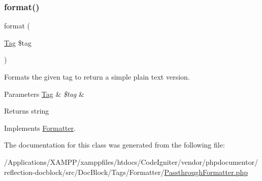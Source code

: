 \subsubsection{\texorpdfstring{format()}{format()}}
{\footnotesize\ttfamily format (\begin{DoxyParamCaption}\item[{\mbox{\hyperlink{interfacephp_documentor_1_1_reflection_1_1_doc_block_1_1_tag}{Tag}}}]{\$tag }\end{DoxyParamCaption})}

Formats the given tag to return a simple plain text version.


\begin{DoxyParams}[1]{Parameters}
\mbox{\hyperlink{interfacephp_documentor_1_1_reflection_1_1_doc_block_1_1_tag}{Tag}} & {\em \$tag} & \\
\hline
\end{DoxyParams}
\begin{DoxyReturn}{Returns}
string 
\end{DoxyReturn}


Implements \mbox{\hyperlink{interfacephp_documentor_1_1_reflection_1_1_doc_block_1_1_tags_1_1_formatter_a237fc645f9f13d476abbb368c53b64d0}{Formatter}}.



The documentation for this class was generated from the following file\+:\begin{DoxyCompactItemize}
\item 
/\+Applications/\+X\+A\+M\+P\+P/xamppfiles/htdocs/\+Code\+Igniter/vendor/phpdocumentor/reflection-\/docblock/src/\+Doc\+Block/\+Tags/\+Formatter/\mbox{\hyperlink{_passthrough_formatter_8php}{Passthrough\+Formatter.\+php}}\end{DoxyCompactItemize}

